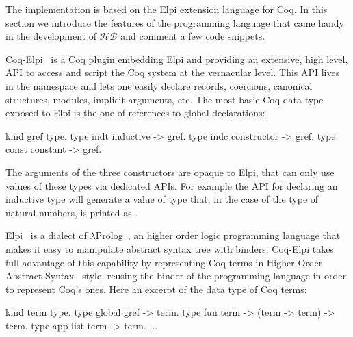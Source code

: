 \documentclass[a4paper,UKenglish,cleveref, autoref]{lipics-v2019}
\newcommand{\HB}{\ensuremath{\mathcal{HB}}}
\theoremstyle{implem}
\theoremstyle{implem}
\theoremstyle{command}
\begin{document}
The implementation is based on the Elpi
extension language for Coq. In this section we introduce the features of the
programming language that came handy in the development of \HB{} and
comment a few code snippets.

Coq-Elpi~\cite{CoqElpi} is a Coq plugin embedding
Elpi and providing an
extensive, high level, API to access and script the Coq system at the
vernacular level.
This API lives in the  namespace and lets one easily declare
records, coercions, canonical structures, modules, implicit arguments, etc.
The most basic Coq data type exposed to Elpi is the one of references to global
declarations:

\begin{elpicode}
kind gref  type.                 %
type indt  inductive -> gref.    %
type indc  constructor -> gref.  %
type const constant -> gref.     %
\end{elpicode}

The arguments of the three constructors are opaque to Elpi, that can only use
values of these types via dedicated APIs. For example the API for declaring
an inductive type will generate a value of type  that,
in the case of the type of natural numbers, is printed as .

Elpi~\cite{DBLP:conf/lpar/DunchevGCT15} is a dialect
of $\lambda$Prolog~\cite{Miller:2012:PHL:2331097}, an higher order
logic programming language that makes it easy to manipulate abstract syntax
tree with binders. Coq-Elpi takes full advantage of this capability by
representing Coq terms in Higher Order Abstract
Syntax~\cite{10.1145/53990.54010} style, reusing the binder of the programming
language in order to represent Coq's ones. Here an excerpt of the data
type of Coq terms:

\begin{elpicode}
kind term type.                              %
type global gref -> term.                    %
type fun    term -> (term -> term) -> term.  %
type app    list term -> term.               %
... %
\end{elpicode}
\end{document}
